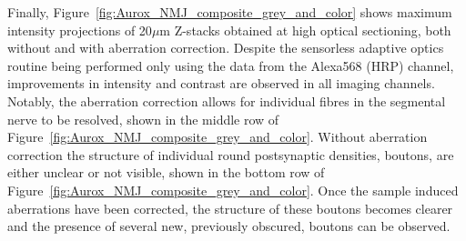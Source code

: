 Finally, Figure~\ref{fig:Aurox_NMJ_composite_grey_and_color} shows maximum 
intensity projections of 20$\mu$m Z-stacks obtained at high optical 
sectioning, both without and with aberration correction. Despite the 
sensorless adaptive optics routine being performed only using the data 
from the Alexa568 (HRP) channel, improvements in intensity and contrast
are observed in all imaging channels. Notably, the aberration correction 
allows for individual fibres in the segmental nerve to be resolved, shown in 
the middle row of Figure~\ref{fig:Aurox_NMJ_composite_grey_and_color}. Without
aberration correction the structure of individual round postsynaptic 
densities, boutons, are either unclear or not visible, shown in the bottom 
row of Figure~\ref{fig:Aurox_NMJ_composite_grey_and_color}. Once the sample 
induced aberrations have been corrected, the structure of these boutons 
becomes clearer and the presence of several new, previously obscured, boutons 
can be observed.

